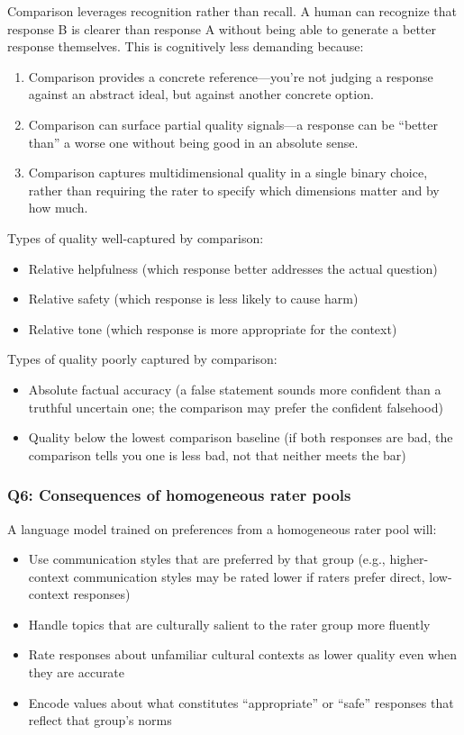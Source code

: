 Comparison leverages recognition rather than recall. A human can recognize that response B is clearer than response A without being able to generate a better response themselves. This is cognitively less demanding because:
\begin{enumerate}
    \item Comparison provides a concrete reference---you're not judging a response against an abstract ideal, but against another concrete option.
    \item Comparison can surface partial quality signals---a response can be ``better than'' a worse one without being good in an absolute sense.
    \item Comparison captures multidimensional quality in a single binary choice, rather than requiring the rater to specify which dimensions matter and by how much.
\end{enumerate}

Types of quality well-captured by comparison:
\begin{itemize}
    \item Relative helpfulness (which response better addresses the actual question)
    \item Relative safety (which response is less likely to cause harm)
    \item Relative tone (which response is more appropriate for the context)
\end{itemize}

Types of quality poorly captured by comparison:
\begin{itemize}
    \item Absolute factual accuracy (a false statement sounds more confident than a truthful uncertain one; the comparison may prefer the confident falsehood)
    \item Quality below the lowest comparison baseline (if both responses are bad, the comparison tells you one is less bad, not that neither meets the bar)
\end{itemize}

\subsubsection*{Q6: Consequences of homogeneous rater pools}

A language model trained on preferences from a homogeneous rater pool will:
\begin{itemize}
    \item Use communication styles that are preferred by that group (e.g., higher-context communication styles may be rated lower if raters prefer direct, low-context responses)
    \item Handle topics that are culturally salient to the rater group more fluently
    \item Rate responses about unfamiliar cultural contexts as lower quality even when they are accurate
    \item Encode values about what constitutes ``appropriate'' or ``safe'' responses that reflect that group's norms
\end{itemize}

